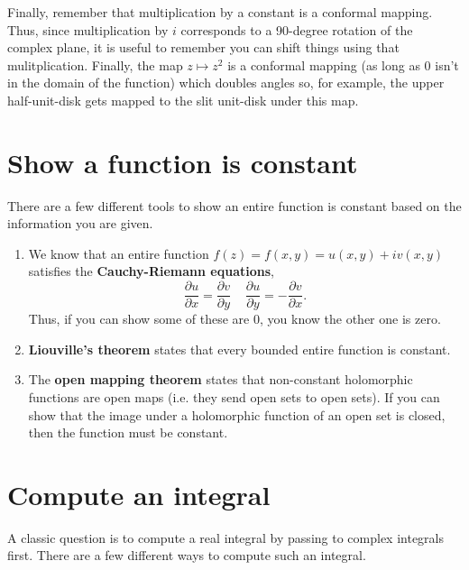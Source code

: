 \documentclass[10pt]{article}
\begin{document}
Finally, remember that multiplication by a constant is a conformal mapping. Thus, since multiplication by $i$ corresponds to a 90-degree rotation of the complex plane, it is useful to remember you can shift things using that mulitplication. Finally, the map $z \mapsto z^2$ is a conformal mapping (as long as $0$ isn't in the domain of the function) which doubles angles so, for example, the upper half-unit-disk gets mapped to the slit unit-disk under this map.

\section{Show a function is constant}

There are a few different tools to show an entire function is constant based on the information you are given.

\begin{enumerate}
\item We know that an entire function $f(z) = f(x,y) = u(x,y) + i v(x,y)$ satisfies the \textbf{Cauchy-Riemann equations},
\[ \frac{\partial u}{\partial x} = \frac{\partial v}{\partial y} \; \; \; \; \frac{\partial u}{\partial y} = - \frac{\partial v}{\partial x} .\]
Thus, if you can show some of these are $0$, you know the other one is zero.

\item \textbf{Liouville's theorem} states that every bounded entire function is constant.
\item The \textbf{open mapping theorem} states that non-constant holomorphic functions are open maps (i.e. they send open sets to open sets). If you can show that the image under a holomorphic function of an open set is closed, then the function must be constant.
\end{enumerate}


\section{Compute an integral}
A classic question is to compute a real integral by passing to complex integrals first.
There are a few different ways to compute such an integral.
\end{document}
